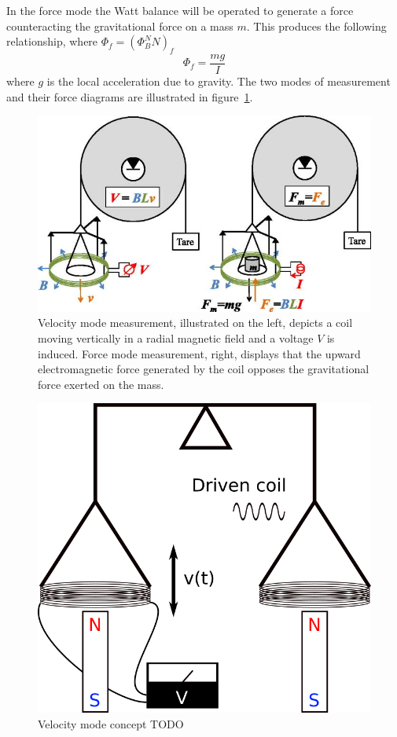 \documentclass[aps,prstab,reprint,12pt]{revtex4-1}
\begin{document}
In the force mode the Watt balance will be operated to generate a force counteracting the gravitational force on a mass $m$. This produces the following relationship, where $\Phi_f = (\Phi_B^NN)_f$
\begin{equation}\label{eq:force_equation}
    \Phi_f = \frac{mg}{I}
\end{equation}
where $g$ is the local acceleration due to gravity. The two modes of measurement and their force diagrams are illustrated in figure~\ref{fig:Force}. 

\begin{figure}[t]
     \centering\includegraphics[width=.95\linewidth]{figs/Force_Diagram.jpeg}
     \caption{Velocity mode measurement, illustrated on the left, depicts a coil moving vertically in a radial magnetic field and a voltage $V$ is induced. Force mode measurement, right, displays that the upward electromagnetic force generated by the coil opposes the gravitational force exerted on the mass. \cite{Chao2015}}\label{fig:Force}
\end{figure}

\begin{figure}[t]
    \centering
    \includegraphics[width=0.6\linewidth]{figs/watt-balance-vmode.png}
    \caption{Velocity mode concept  TODO}
    \label{fig:vmode-concept}
\end{figure}
\end{document}
